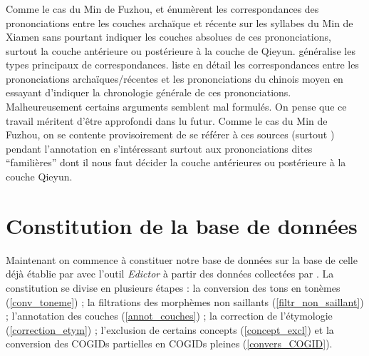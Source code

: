 \documentclass{scrbook}
\newcounter{c}[subsubsection]
\newcommand{\difwenbai}{couches archaïque et récente\xspace}
\newcommand{\diflaoxin}{sociolectes âgé et jeune\xspace}
\newcommand{\iso}{syllabes isolées\xspace}
\begin{document}
\begin{sloppypar}
\subsection{\MakeCapital{\difwenbai}}
Comme le cas du Min de Fuzhou, \textcite[59--81]{Li1963xiamen} et \textcite[100--113]{Zhou1998xiamen_yanjiu} énumèrent les correspondances des prononciations entre les \difwenbai sur les syllabes du Min de Xiamen sans pourtant indiquer les couches absolues de ces prononciations, surtout la couche antérieure ou postérieure à la couche de Qieyun. \textcite[81--89]{Li1963xiamen} généralise les types principaux de correspondances. \textcite[119--140]{Zhou1998xiamen_yanjiu} liste en détail les correspondances entre les prononciations archaïques/récentes et les prononciations du chinois moyen en essayant d'indiquer la chronologie générale de ces prononciations. Malheureusement certains arguments semblent mal formulés. On pense que ce travail méritent d'être approfondi dans lu futur. Comme le cas du Min de Fuzhou, on se contente provisoirement de se référer à ces sources (surtout \cite[100--113]{Zhou1998xiamen_yanjiu}) pendant l'annotation en s'intéressant surtout aux prononciations dites ``familières'' dont il nous faut décider la couche antérieures ou postérieure à la couche Qieyun. 


\chapter{Constitution de la base de données}\label{database}
Maintenant on commence à constituer notre base de données sur la base de celle déjà établie par \textcite{wu2023annotating} avec l'outil \textit{Edictor} à partir des données collectées par \textcite[32--132]{Liu2007hexinci}. La constitution se divise en plusieurs étapes : la conversion des tons en tonèmes (\ref{conv_toneme}) ; la filtrations des morphèmes non saillants (\ref{filtr_non_saillant}) ; l'annotation des couches (\ref{annot_couches}) ; la correction de l'étymologie (\ref{correction_etym}) ; l'exclusion de certains concepts (\ref{concept_excl}) et la conversion des COGIDs partielles en COGIDs pleines (\ref{convers_COGID}).


\end{sloppypar}
\end{document}
